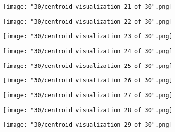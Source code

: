 \documentclass{article}
\begin{document}
\begin{figure}[h!]
    \noindent\texttt{[image: "30/centroid visualization 21 of 30".png]}
\end{figure}

\begin{figure}[h!]
    \noindent\texttt{[image: "30/centroid visualization 22 of 30".png]}
\end{figure}

\begin{figure}[h!]
    \noindent\texttt{[image: "30/centroid visualization 23 of 30".png]}
\end{figure}

\begin{figure}[h!]
    \noindent\texttt{[image: "30/centroid visualization 24 of 30".png]}
\end{figure}

\begin{figure}[h!]
    \noindent\texttt{[image: "30/centroid visualization 25 of 30".png]}
\end{figure}

\begin{figure}[h!]
    \noindent\texttt{[image: "30/centroid visualization 26 of 30".png]}
\end{figure}

\begin{figure}[h!]
    \noindent\texttt{[image: "30/centroid visualization 27 of 30".png]}
\end{figure}

\begin{figure}[h!]
    \noindent\texttt{[image: "30/centroid visualization 28 of 30".png]}
\end{figure}

\begin{figure}[h!]
    \noindent\texttt{[image: "30/centroid visualization 29 of 30".png]}
\end{figure}
\end{document}
